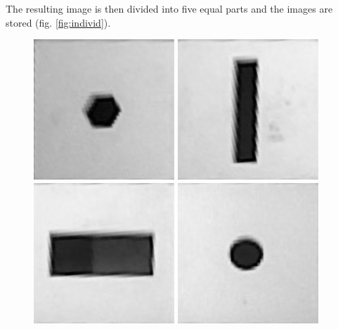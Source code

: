 \documentclass{article}
\begin{document}
The resulting image is then divided into five equal parts and the images are stored (fig. \ref{fig:individ}).\\
\begin{figure}[h!]
\begin{minipage}{\textwidth}
\centering
\includegraphics[scale=0.3]{images/tile0.jpg}
\hspace{0.1cm}
\includegraphics[scale=0.3]{images/tile1.jpg}
\hspace{0.1cm}
\includegraphics[scale=0.3]{images/tile2.jpg}
\hspace{0.1cm}
\includegraphics[scale=0.3]{images/tile3.jpg}

\end{minipage}
\end{figure}
\end{document}
